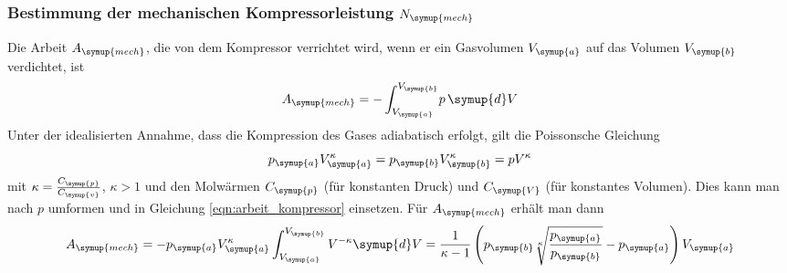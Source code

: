   \subsubsection{Bestimmung der mechanischen Kompressorleistung $N_\symup{mech}$}
  Die Arbeit $A_\symup{mech}$, die von dem Kompressor verrichtet wird, wenn er ein
  Gasvolumen $V_\symup{a}$ auf das Volumen $V_\symup{b}$ verdichtet, ist
  \begin{equation}
    A_\symup{mech} = - \int_{V_\symup{a}}^{V_\symup{b}} \!p \,\symup{d}V
    \label{eqn:arbeit_kompressor}
  \end{equation}
  Unter der idealisierten Annahme, dass die Kompression des Gases adiabatisch erfolgt,
  gilt die Poissonsche Gleichung
  \begin{equation}
    p_\symup{a} V_\symup{a}^\kappa = p_\symup{b} V_\symup{b}^\kappa = p V^\kappa
    \label{eqn:poissongl}
  \end{equation}
  mit $\kappa = \frac{C_\symup{p}}{C_\symup{v}}$, $\kappa > 1$ und den Molwärmen
  $C_\symup{p}$ (für konstanten Druck) und $C_\symup{V}$ (für konstantes Volumen).
  Dies kann man nach $p$ umformen und in Gleichung \eqref{eqn:arbeit_kompressor}
  einsetzen. Für $A_\symup{mech}$ erhält man dann
  \begin{equation}
    A_\symup{mech} = - p_\symup{a} V_\symup{a}^\kappa
    \int_{V_\symup{a}}^{V_\symup{b}} V^{-\kappa} \symup{d}V
    = \frac{1}{\kappa - 1}\left(p_\symup{b} \sqrt[\kappa]{\frac{p_\symup{a}}{p_\symup{b}}}
    - p_\symup{a} \right) V_\symup{a}
    \label{eqn:arbeit2}
  \end{equation}
\cite{sample}
